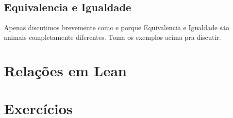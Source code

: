 \subsection{Equivalencia e Igualdade}
Apenas discutimos brevemente como e porque Equivalencia e Igualdade são animais completamente diferentes. Toma os exemplos acima pra discutir.

\section{Relações em Lean}

\section{Exercícios}
